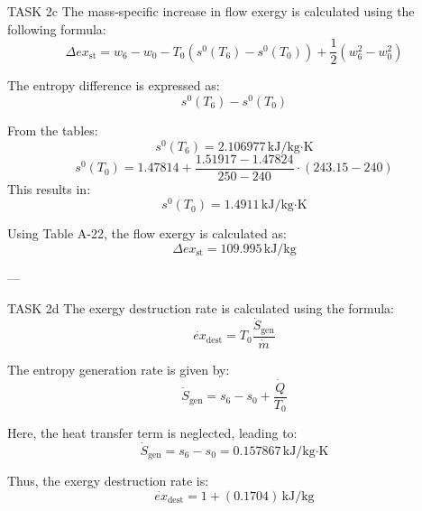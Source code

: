 TASK 2c  
The mass-specific increase in flow exergy is calculated using the following formula:  
\[
\Delta ex_{\text{st}} = w_6 - w_0 - T_0 \left( s^0(T_6) - s^0(T_0) \right) + \frac{1}{2} \left( w_6^2 - w_0^2 \right)
\]  

The entropy difference is expressed as:  
\[
s^0(T_6) - s^0(T_0)
\]  

From the tables:  
\[
s^0(T_6) = 2.106977 \, \text{kJ/kg·K}
\]  
\[
s^0(T_0) = 1.47814 + \frac{1.51917 - 1.47824}{250 - 240} \cdot (243.15 - 240)
\]  
This results in:  
\[
s^0(T_0) = 1.4911 \, \text{kJ/kg·K}
\]  

Using Table A-22, the flow exergy is calculated as:  
\[
\Delta ex_{\text{st}} = 109.995 \, \text{kJ/kg}
\]  

---

TASK 2d  
The exergy destruction rate is calculated using the formula:  
\[
\dot{ex}_{\text{dest}} = T_0 \frac{\dot{S}_{\text{gen}}}{\dot{m}}
\]  

The entropy generation rate is given by:  
\[
\dot{S}_{\text{gen}} = s_6 - s_0 + \frac{\dot{Q}}{T_0}
\]  

Here, the heat transfer term is neglected, leading to:  
\[
\dot{S}_{\text{gen}} = s_6 - s_0 = 0.157867 \, \text{kJ/kg·K}
\]  

Thus, the exergy destruction rate is:  
\[
\dot{ex}_{\text{dest}} = 1 + (0.1704) \, \text{kJ/kg}
\]  